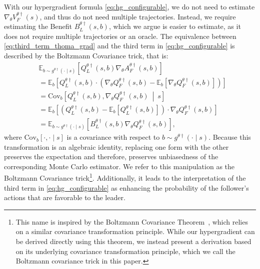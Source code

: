 \documentclass[letterpaper]{article} %
\providecommand{\E}{\mathbb{E}} %
\begin{document}
With our hypergradient formula \eqref{eq:hg_configurable}, we do not need to estimate $\nabla_{\theta} V_F^{{\theta} \dagger}(s)$, and thus do not need multiple trajectories. 
Instead, we require estimating the Benefit $B_L^{{\theta} \dagger}(s, b)$, which we argue is easier to estimate, as it does not require multiple trajectories or an oracle.
The equivalence between \eqref{eq:third_term_thoma_grad} and the third term in \eqref{eq:hg_configurable} is described by the Boltzmann Covariance trick, that is:
\begin{equation*}
\begin{split}
    &\E_{b\sim g^{\theta\dagger}(\cdot\mid s)}\left[Q_L^{\theta\dag}(s,b)\nabla_{\theta} A_F^{{\theta} \dagger}(s, b)\right]\nonumber\\
    &=\E_{b}\left[Q_L^{\theta\dag}(s,b)\cdot\left(\nabla_{\theta} Q_F^{{\theta} \dagger}(s, b) - \E_{b}\left[\nabla_{\theta} Q_F^{{\theta} \dagger}(s, b)\right]\right)\right]\\
    &=\mathrm{Cov}_{b}\left[Q_L^{\theta\dag}(s,b), \nabla_{\theta}Q_F^{\theta\dag}(s,b)~\middle|~ s\right]\\
    &=\E_{b}\left[\left(Q_L^{\theta\dag}(s,b) - \E_{b}\left[Q_L^{{\theta} \dagger}(s, b)\right]\right)\cdot \nabla_{\theta} Q_F^{{\theta} \dagger}(s, b)\right]\\
    &=\E_{b\sim g^{\theta\dagger}(\cdot\mid s)}\left[B_L^{\theta\dag}(s,b)\nabla_{\theta} Q_F^{{\theta} \dagger}(s, b)\right],
\end{split}    
\end{equation*}
where $\mathrm{Cov}_{b}[\cdot,\cdot\mid s]$ is a covariance with respect to $b\sim g^{\theta\dagger}(\cdot\mid s)$.
Because this transformation is an algebraic identity, replacing one form with the other preserves the expectation and therefore, preserves unbiasedness of the corresponding Monte Carlo estimator.
We refer to this manipulation as the Boltzmann Covariance trick\footnote{This name is inspired by the Boltzmann Covariance Theorem~\citep{Movellan1998-xi}, which relies on a similar covariance transformation principle.
While our hypergradient can be derived directly using this theorem, we instead present a derivation based on its underlying covariance transformation principle, which we call the Boltzmann covariance trick in this paper.}.
Additionally, it leads to the interpretation of the third term in \eqref{eq:hg_configurable} as enhancing the probability of the follower's actions that are favorable to the leader.
\end{document}
